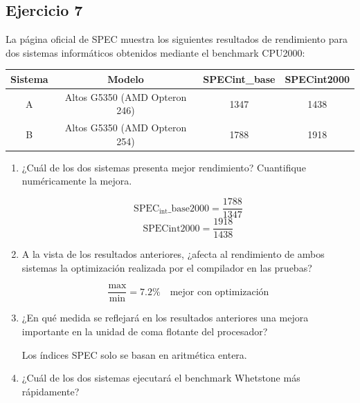 \subsection{Ejercicio 7}
\noindent
La página oficial de SPEC muestra los siguientes resultados de rendimiento para dos sistemas informáticos obtenidos mediante el benchmark CPU2000:
\begin{table}[H]
\centering
\begin{tabular}{|c|c|c|c|}
\hline
\textbf{Sistema} & \textbf{Modelo}               & \textbf{SPECint\_base} & \textbf{SPECint2000} \\ \hline
A                & Altos G5350 (AMD Opteron 246) & 1347                   & 1438                 \\ \hline
B                & Altos G5350 (AMD Opteron 254) & 1788                   & 1918                 \\ \hline
\end{tabular}
\end{table}
\begin{enumerate}
    \item ¿Cuál de los dos sistemas presenta mejor rendimiento? Cuantifique numéricamente la mejora.
\begin{tcolorbox}[colback=white,colframe=cyan!50!black,fonttitle=\bfseries]
\[
\text{SPEC}_{\text{int}}\_\text{base2000}=\dfrac{1788}{1347}
\]
\[
\text{SPECint2000}=\dfrac{1918}{1438}
\]
\end{tcolorbox}    
    \item A la vista de los resultados anteriores, ¿afecta al rendimiento de ambos sistemas la optimización realizada por el compilador en las pruebas?
\begin{tcolorbox}[colback=white,colframe=cyan!50!black,fonttitle=\bfseries]
\[
\dfrac{\text{max}}{\text{min}}=7.2\%\quad\text{mejor con optimización}
\]
\end{tcolorbox}    
    \item ¿En qué medida se reflejará en los resultados anteriores una mejora importante en la unidad de coma flotante del procesador?
\begin{tcolorbox}[colback=white,colframe=cyan!50!black,fonttitle=\bfseries]
Los índices SPEC solo se basan en aritmética entera.
\end{tcolorbox}    
    \item ¿Cuál de los dos sistemas ejecutará el benchmark Whetstone más rápidamente?
\begin{tcolorbox}[colback=white,colframe=cyan!50!black,fonttitle=\bfseries]
\end{tcolorbox}    
\end{enumerate}
